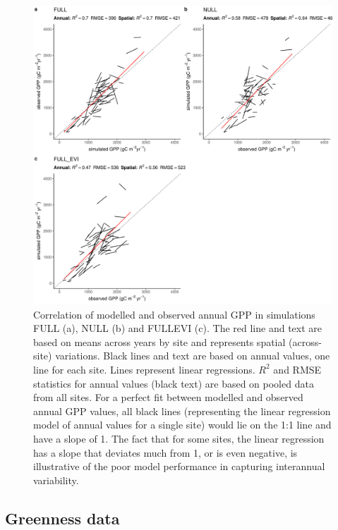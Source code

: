 \documentclass{myreport}
\begin{document}
\begin{figure}[!ht]
    \includegraphics[width=\textwidth]{fig/modobs_spatial_annual.pdf}
    \caption{Correlation of modelled and observed annual GPP in simulations FULL (a), NULL (b) and FULL\textunderscore EVI (c). The red line and text are based on means across years by site and represents spatial (across-site) variations. Black lines and text are based on annual values, one line for each site. Lines represent linear regressions. $R^2$ and RMSE statistics for annual values (black text) are based on pooled data from all sites. For a perfect fit between modelled and observed annual GPP values, all black lines (representing the linear regression model of annual values for a single site) would lie on the 1:1 line and have a slope of 1. The fact that for some sites, the linear regression has a slope that deviates much from 1, or is even negative, is illustrative of the poor model performance in capturing interannual variability.}
    \label{fig:modobs_spatialannual}
\end{figure}


\subsection{Greenness data}
\label{sec:results_greenness}
\end{document}
